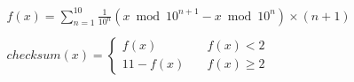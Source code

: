 \documentclass[10pt]{article} %
\begin{document}
\color{fgC}\begin{align*}&f(x) = \sum_{n=1}^{10} \frac{1}{10^n}(x \bmod 10^{n + 1} - x \bmod 10^n) \times (n+1)  \\
\\ 
& checksum(x) = \left\{
        \begin{array}{ll}
            f(x) & \quad f(x) < 2 \\
            11 - f(x) & \quad f(x) \geq 2
        \end{array}
    \right.
\end{align*}
\end{document}
